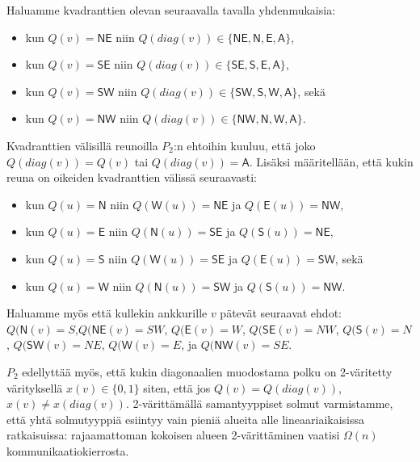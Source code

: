 \documentclass[12pt,finnish]{tktltiki2}
\theoremstyle{definition}
\theoremstyle{remark}
\begin{document}
Haluamme kvadranttien olevan seuraavalla tavalla yhdenmukaisia:
\begin{itemize}[label={}]
  \item kun $Q(v) = \mathsf{NE}$ niin $Q(diag(v)) \in \{\mathsf{NE}, \mathsf{N}, \mathsf{E}, \mathsf{A}\}$,
  \item kun $Q(v) = \mathsf{SE}$ niin $Q(diag(v)) \in \{\mathsf{SE}, \mathsf{S}, \mathsf{E}, \mathsf{A}\}$,
  \item kun $Q(v) = \mathsf{SW}$ niin $Q(diag(v)) \in \{\mathsf{SW}, \mathsf{S}, \mathsf{W}, \mathsf{A}\}$, sekä
  \item kun $Q(v) = \mathsf{NW}$ niin $Q(diag(v)) \in \{\mathsf{NW}, \mathsf{N}, \mathsf{W}, \mathsf{A}\}$.
\end{itemize}
Kvadranttien välisillä reunoilla $P_2$:n ehtoihin kuuluu, että joko $Q(diag(v)) = Q(v)$ tai $Q(diag(v)) = \mathsf{A}$. Lisäksi määritellään, että kukin reuna on oikeiden kvadranttien välissä seuraavasti:
\begin{itemize}[label={}]
  \item kun $Q(u) = \mathsf{N}$ niin $Q(\mathsf{W}(u)) = \mathsf{NE}$ ja $Q(\mathsf{E}(u)) = \mathsf{NW}$,
  \item kun $Q(u) = \mathsf{E}$ niin $Q(\mathsf{N}(u)) = \mathsf{SE}$ ja $Q(\mathsf{S}(u)) = \mathsf{NE}$,
  \item kun $Q(u) = \mathsf{S}$ niin $Q(\mathsf{W}(u)) = \mathsf{SE}$ ja $Q(\mathsf{E}(u)) = \mathsf{SW}$, sekä
  \item kun $Q(u) = \mathsf{W}$ niin $Q(\mathsf{N}(u)) = \mathsf{SW}$ ja $Q(\mathsf{S}(u)) = \mathsf{NW}$.
\end{itemize}

Haluamme myös että kullekin ankkurille $v$ pätevät seuraavat ehdot: $Q(\mathsf{N}(v) = S$,$Q(\mathsf{NE}(v) = SW$, $Q(\mathsf{E}(v) = W$, $Q(\mathsf{SE}(v) = NW$, $Q(\mathsf{S}(v) = N$, $Q(\mathsf{SW}(v) = NE$, $Q(\mathsf{W}(v) = E$, ja $Q(\mathsf{NW}(v) = SE$.

$P_2$ edellyttää myös, että kukin diagonaalien muodostama polku on 2-väritetty värityksellä $x(v) \in \{0, 1\}$ siten, että jos $Q(v) = Q(diag(v))$, $x(v) \neq x(diag(v))$. 2-värittämällä samantyyppiset solmut varmistamme, että yhtä solmutyyppiä esiintyy vain pieniä alueita alle lineaariaikaisissa ratkaisuissa: rajaamattoman kokoisen alueen 2-värittäminen vaatisi $\Omega(n)$ kommunikaatiokierrosta.
\end{document}
